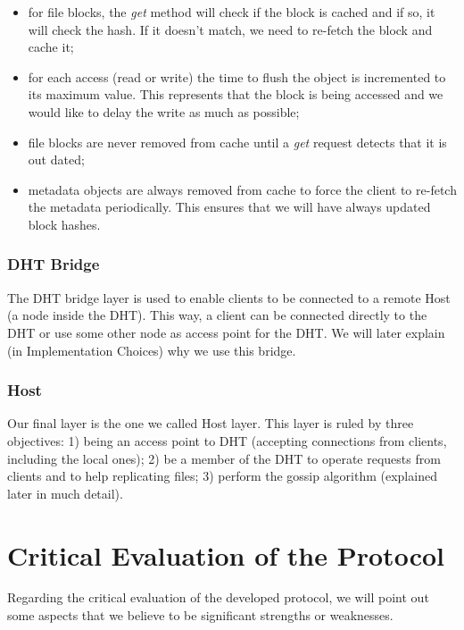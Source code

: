 \documentclass[times,9pt,article]{llncs}
\begin{document}
\begin{itemize}
\item for file blocks, the \emph{get} method will check if the block is cached and if so, it will check the hash. If it doesn't match, we need to re-fetch the block and cache it;
\item for each access (read or write) the time to flush the object is incremented to its maximum value. This represents that the block is being accessed and we would like to delay the write as much as possible;
\item file blocks are never removed from cache until a \emph{get} request detects that it is out dated;
\item metadata objects are always removed from cache to force the client to re-fetch the metadata periodically. This ensures that we will have always updated block hashes.
\end{itemize}

\subsubsection{DHT Bridge}

The DHT bridge layer is used to enable clients to be connected to a remote Host (a node inside the DHT). This way, a client can be connected directly to the DHT or use some other node as access point for the DHT. We will later explain (in Implementation Choices) why we use this bridge.

\subsubsection{Host}
Our final layer is the one we called Host layer. This layer is ruled by three objectives: 1) being an access point to DHT (accepting connections from clients, including the local ones); 2) be a member of the DHT to operate requests from clients and to help replicating files; 3) perform the gossip algorithm (explained later in much detail).

\section{Critical Evaluation of the Protocol}

Regarding the critical evaluation of the developed protocol, we will point out some aspects that we believe to be significant strengths or weaknesses.
\end{document}
